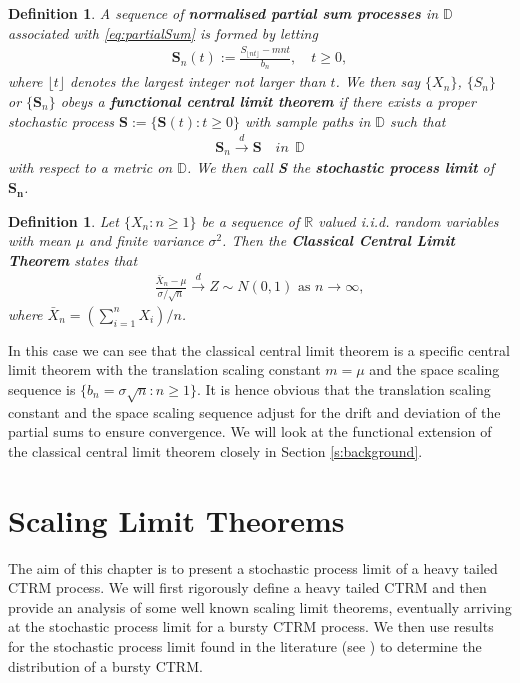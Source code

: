 \documentclass[honours,12pt]{unswthesis}
\newcommand{\R}{\mathbb{R}}
\newcommand{\1}{\mathbf 1}
\newcommand{\Floor}[1]{{\lfloor {#1} \rfloor}}
\newcommand{\cd}{\overset{d}{\longrightarrow}}
\newcommand{\D}{\mathbb{D}}
\newtheorem{definition}[equation]{Definition}
\numberwithin{equation}{section}
\theoremstyle{definition}
\theoremstyle{remark}
\begin{document}
\begin{definition}
	A sequence of \textbf{normalised partial sum processes} in $\D$ associated with \ref{eq:partialSum} is formed by letting
	\begin{align}
		\textbf{S}_n(t):=\frac{S_\Floor{nt}-mnt}{b_n},\quad t\geq 0,
	\end{align}
	where $\lfloor t \rfloor$ denotes the largest integer not larger than $t$. We then say $\{X_n\}$, $\{S_n\}$ or $\{\textbf{S}_n\}$ obeys a \textbf{functional central limit theorem} if there exists a proper stochastic process $\textbf{S}:=\{\textbf{S}(t):t\geq0\}$ with sample paths in $\D$ such that
	\begin{align*}
		\textbf{S}_n \cd \textbf{S}\quad in\ \ \D
	\end{align*}
	with respect to a metric on $\D$. We then call \textbf{S} the \textbf{stochastic process limit} of $\boldsymbol{S_n}$.\\
\end{definition}


\begin{definition}
Let $\{X_n:n\geq1\}$ be a sequence of $\R$ valued i.i.d. random variables with mean $\mu$ and finite variance $\sigma^2$. Then the \textbf{Classical Central Limit Theorem} states that
\begin{align*}
	\frac{\bar{X}_n-\mu}{\sigma/\sqrt{n}} \cd Z \sim N(0,1) \textrm{ as 				$n\to\infty,$}
\end{align*}
where $\bar{X}_n=(\sum^n_{i=1}X_i)/n$.\\
\end{definition}
In this case we can see that the classical central limit theorem is a specific central limit theorem with the translation scaling constant $m=\mu$ and the space scaling sequence is $\{b_n=\sigma\sqrt{n}:n\geq1 \}$. It is hence obvious that the translation scaling constant and the space scaling sequence adjust for the drift and deviation of the partial sums to ensure convergence. We will look at the functional extension of the classical central limit theorem closely in Section \ref{s:background}.

\chapter{Scaling Limit Theorems}\label{ScalingLimits}
The aim of this chapter is to present a stochastic process limit of a heavy tailed CTRM process. We will first rigorously define a heavy tailed CTRM and then provide an analysis of some well known scaling limit theorems, eventually arriving at the stochastic process limit for a bursty CTRM process. We then use results for the stochastic process limit found in the literature (see \cite{MeerschaertStoev08}) to determine the distribution of a bursty CTRM.
\end{document}
